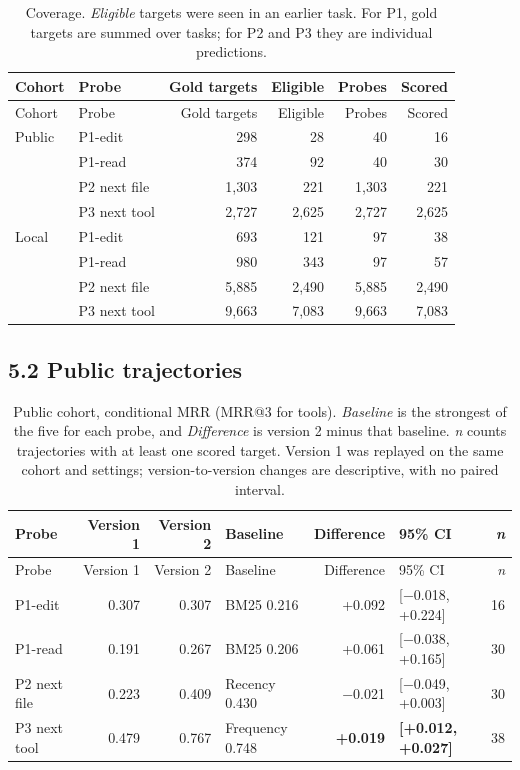 \documentclass[
  american,
  11pt,
]{article}
\begin{document}
\begin{longtable}[]{@{}llrrrr@{}}
\caption{Coverage. \emph{Eligible} targets were seen in an earlier task. For P1, gold targets are summed over
tasks; for P2 and P3 they are individual predictions.}\tabularnewline
\toprule\noalign{}
Cohort & Probe & Gold targets & Eligible & Probes & Scored \\
\midrule\noalign{}
\endfirsthead
\toprule\noalign{}
Cohort & Probe & Gold targets & Eligible & Probes & Scored \\
\midrule\noalign{}
\endhead
\bottomrule\noalign{}
\endlastfoot
Public & P1-edit & 298 & 28 & 40 & 16 \\
& P1-read & 374 & 92 & 40 & 30 \\
& P2 next file & 1,303 & 221 & 1,303 & 221 \\
& P3 next tool & 2,727 & 2,625 & 2,727 & 2,625 \\
Local & P1-edit & 693 & 121 & 97 & 38 \\
& P1-read & 980 & 343 & 97 & 57 \\
& P2 next file & 5,885 & 2,490 & 5,885 & 2,490 \\
& P3 next tool & 9,663 & 7,083 & 9,663 & 7,083 \\
\end{longtable}

\subsection{5.2 Public trajectories}\label{public-trajectories}

\begin{longtable}[]{@{}lrrlrlr@{}}
\caption{Public cohort, conditional MRR (MRR@3 for tools). \emph{Baseline} is the strongest of the five for
each probe, and \emph{Difference} is version 2 minus that baseline. \emph{n} counts trajectories with at least
one scored target. Version 1 was replayed on the same cohort and settings; version-to-version changes are
descriptive, with no paired interval.}\tabularnewline
\toprule\noalign{}
Probe & Version 1 & Version 2 & Baseline & Difference & 95\% CI & \emph{n} \\
\midrule\noalign{}
\endfirsthead
\toprule\noalign{}
Probe & Version 1 & Version 2 & Baseline & Difference & 95\% CI & \emph{n} \\
\midrule\noalign{}
\endhead
\bottomrule\noalign{}
\endlastfoot
P1-edit & 0.307 & 0.307 & BM25 0.216 & +0.092 & {[}−0.018, +0.224{]} & 16 \\
P1-read & 0.191 & 0.267 & BM25 0.206 & +0.061 & {[}−0.038, +0.165{]} & 30 \\
P2 next file & 0.223 & 0.409 & Recency 0.430 & −0.021 & {[}−0.049, +0.003{]} & 30 \\
P3 next tool & 0.479 & 0.767 & Frequency 0.748 & \textbf{+0.019} & \textbf{{[}+0.012, +0.027{]}} & 38 \\
\end{longtable}
\end{document}
